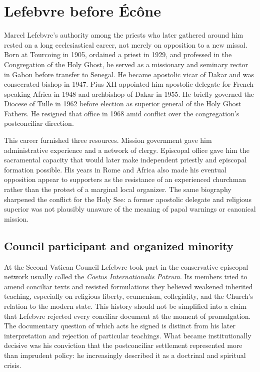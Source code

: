 \section{Lefebvre before Écône}

Marcel Lefebvre's authority among the priests who later gathered around him rested on a long ecclesiastical career, not merely on opposition to a new missal. Born at Tourcoing in 1905, ordained a priest in 1929, and professed in the Congregation of the Holy Ghost, he served as a missionary and seminary rector in Gabon before transfer to Senegal. He became apostolic vicar of Dakar and was consecrated bishop in 1947. Pius XII appointed him apostolic delegate for French-speaking Africa in 1948 and archbishop of Dakar in 1955. He briefly governed the Diocese of Tulle in 1962 before election as superior general of the Holy Ghost Fathers. He resigned that office in 1968 amid conflict over the congregation's postconciliar direction.

This career furnished three resources. Mission government gave him administrative experience and a network of clergy. Episcopal office gave him the sacramental capacity that would later make independent priestly and episcopal formation possible. His years in Rome and Africa also made his eventual opposition appear to supporters as the resistance of an experienced churchman rather than the protest of a marginal local organizer. The same biography sharpened the conflict for the Holy See: a former apostolic delegate and religious superior was not plausibly unaware of the meaning of papal warnings or canonical mission.

\subsection{Council participant and organized minority}

At the Second Vatican Council Lefebvre took part in the conservative episcopal network usually called the \emph{Coetus Internationalis Patrum}. Its members tried to amend conciliar texts and resisted formulations they believed weakened inherited teaching, especially on religious liberty, ecumenism, collegiality, and the Church's relation to the modern state. This history should not be simplified into a claim that Lefebvre rejected every conciliar document at the moment of promulgation. The documentary question of which acts he signed is distinct from his later interpretation and rejection of particular teachings. What became institutionally decisive was his conviction that the postconciliar settlement represented more than imprudent policy: he increasingly described it as a doctrinal and spiritual crisis.

